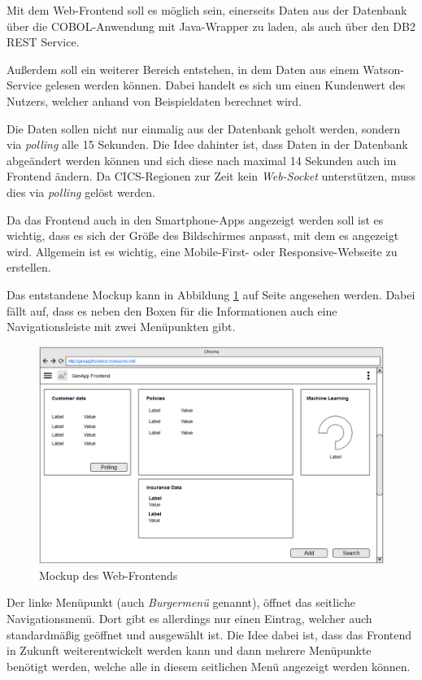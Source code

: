 Mit dem Web-Frontend soll es möglich sein, einerseits Daten aus der Datenbank über die COBOL-Anwendung mit Java-Wrapper
zu laden, als auch über den DB2 REST Service.

Außerdem soll ein weiterer Bereich entstehen, in dem Daten aus einem Watson-Service gelesen werden können. Dabei handelt
es sich um einen Kundenwert des Nutzers, welcher anhand von Beispieldaten berechnet wird.

Die Daten sollen nicht nur einmalig aus der Datenbank geholt werden, sondern via \textit{polling} alle 15 Sekunden. Die
Idee dahinter ist, dass Daten in der Datenbank abgeändert werden können und sich diese nach maximal 14 Sekunden auch im
Frontend ändern. Da CICS-Regionen zur Zeit kein \textit{Web-Socket} unterstützen, muss dies via \textit{polling} gelöst
werden.

Da das Frontend auch in den Smartphone-Apps angezeigt werden soll ist es wichtig, dass es sich der Größe des Bildschirmes
anpasst, mit dem es angezeigt wird. Allgemein ist es wichtig, eine Mobile-First- oder Responsive-Webseite zu erstellen.

Das entstandene Mockup kann in Abbildung \ref{fig:mockup_website} auf Seite \pageref{fig:mockup_website} angesehen werden.
Dabei fällt auf, dass es neben den Boxen für die Informationen auch eine Navigationsleiste mit zwei Menüpunkten gibt.

\begin{figure}[h]
 \centering
   \includegraphics[scale=0.5]{images/kapitel_4/mockup_website.png}
 \caption{Mockup des Web-Frontends}
 \label{fig:mockup_website}
\end{figure}

Der linke Menüpunkt (auch \textit{Burgermenü} genannt), öffnet das seitliche Navigationsmenü. Dort gibt es allerdings nur einen
Eintrag, welcher auch standardmäßig geöffnet und ausgewählt ist. Die Idee dabei ist, dass das Frontend in Zukunft
weiterentwickelt werden kann und dann mehrere Menüpunkte benötigt werden, welche alle in diesem seitlichen Menü angezeigt
werden können.


